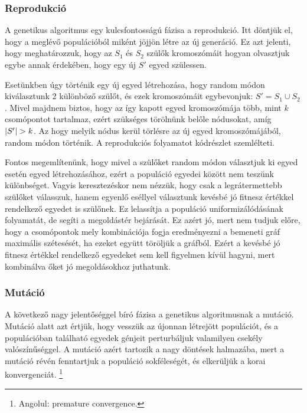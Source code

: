 \subsubsection{Reprodukció}
A genetikus algoritmus egy kulcsfontosságú fázisa a reprodukció.
Itt döntjük el, hogy a meglévő populációból miként jöjjön létre az új generáció.
Ez azt jelenti, hogy meghatározzuk, hogy az $S_{1}$ és $S_{2}$ szülők kromoszómáit
hogyan olvasztjuk egybe annak érdekében, hogy egy új $S'$ egyed szülessen.

Esetünkben úgy történik egy új egyed létrehozása, hogy random módon kiválasztunk 2 különböző szülőt,
és ezek kromoszómáit egybevonjuk: $S' = S_{1} \cup S_{2}$.
Mivel majdnem biztos, hogy az így kapott egyed kromoszómája több, mint $k$ csomópontot tartalmaz,
ezért szükséges törölnünk belőle nódusokat, amíg $\lvert S'\rvert > k$.
Az hogy melyik nódus kerül törlésre az új egyed kromoszómájából, random módon történik.
A reprodukciós folyamatot  kódrészlet szemlélteti.


Fontos megemlítenünk, hogy mivel a szülőket random módon választjuk ki  egyed esetén egyed létrehozásához,
ezért a populáció egyedei között nem teszünk különbséget.
Vagyis keresztezéskor nem nézzük, hogy csak a legrátermettebb szülőket válasszuk,
hanem egyenlő eséllyel választunk kevésbé jó fitnesz értékkel rendelkező egyedet is szülőnek.
Ez lelassítja a populáció uniformizálódásának folyamatát, de segíti a megoldástér bejárását.
Ez azért jó, mert nem tudjuk előre, hogy a csomópontok mely kombinációja
fogja eredményezni a bemeneti gráf maximális szétesését, ha ezeket együtt töröljük a gráfból.
Ezért a kevésbé jó fitnesz értékkel rendelkező egyedeket sem kell figyelmen kívül hagyni,
mert kombinálva őket jó megoldásokhoz juthatunk.


\subsubsection{Mutáció}
A következő nagy jelentőséggel bíró fázisa a genetikus algoritmusnak a mutáció.
Mutáció alatt azt értjük, hogy vesszük az újonnan létrejött populációt,
és a populációban található egyedek génjeit perturbáljuk valamilyen csekély valószínűséggel.
A mutáció azért tartozik a nagy döntések halmazába,
mert a mutáció révén fenntartjuk a populáció sokféleségét, és elkerüljük a korai konvergenciát.
\footnote{
  Angolul: premature convergence.
}

